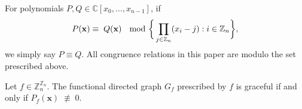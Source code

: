 \begin{defn}\label{defn:polynomial-congruence}
For polynomials $P,Q \in \mathbb{C}[x_0, \ldots, x_{n-1}]$, if
\begin{equation}
P({\bf x}) \equiv \; Q({\bf x}) \; \mod\bigg\{\prod_{j\in\mathbb{Z}_{n}}(x_{i}-j):i\in\mathbb{Z}_{n}\bigg\},
\end{equation}
we simply say $P \equiv Q$. All congruence relations in this paper are modulo the set prescribed above.
\end{defn}

\begin{proposition}\label{prop:polynomial-grace-certificate}
Let $f\in\mathbb{Z}_{n}^{\mathbb{Z}_{n}}$. The functional
directed graph $G_f$ prescribed by $f$ is graceful if and only if $P_f(\mathbf{x}) \; \not\equiv \; 0$.
\end{proposition}

